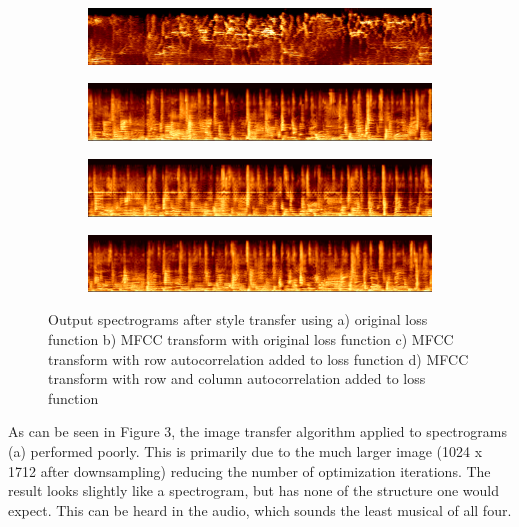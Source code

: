 \documentclass{article}
\begin{document}
\begin{figure}[!h]
\begin{subfigure}{\textwidth}
  \centering
  \includegraphics[width = \textwidth]{out1_spec}
  \caption{}
\end{subfigure}
\begin{subfigure}{\textwidth}
  \centering
  \includegraphics[width = \textwidth]{out2_spec}
  \caption{}
\end{subfigure}
\begin{subfigure}{\textwidth}
  \centering
  \includegraphics[width = \textwidth]{out3_spec}
  \caption{}
\end{subfigure}
\begin{subfigure}{\textwidth}
  \centering
  \includegraphics[width = \textwidth]{out4_spec}
  \caption{}
\end{subfigure}
\caption{Output spectrograms after style transfer using a) original loss function b) MFCC transform with original loss function c) MFCC transform with row autocorrelation added to loss function d) MFCC transform with row and column autocorrelation added to loss function}
\end{figure}

As can be seen in Figure 3, the image transfer algorithm applied to spectrograms (a) performed poorly. This is primarily due to the much larger image (1024 x 1712 after downsampling) reducing the number of optimization iterations. The result looks slightly like a spectrogram, but has none of the structure one would expect. This can be heard in the audio, which sounds the least musical of all four.
\end{document}
